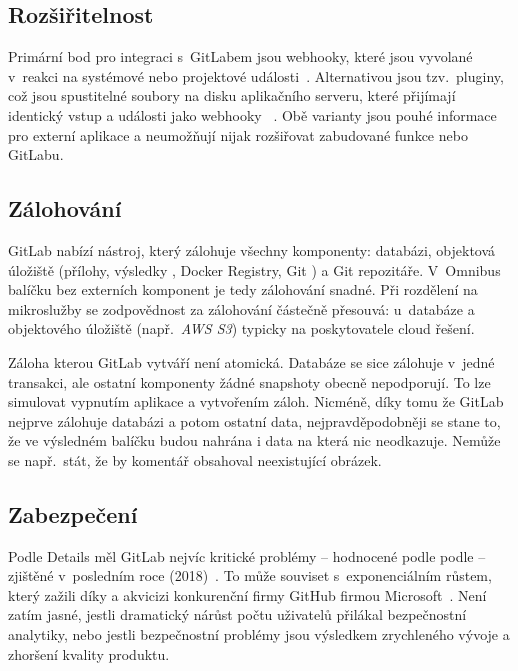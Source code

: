     \subsection{Rozšiřitelnost}
        Primární bod pro integraci s~GitLabem jsou webhooky, které jsou vyvolané v~reakci na systémové nebo projektové události~\cite{gitlab-webhooks}. Alternativou jsou tzv.~pluginy, což jsou spustitelné soubory na disku aplikačního serveru, které přijímají identický vstup a události jako webhooky ~\cite{gitlab-plugins}. Obě varianty jsou pouhé informace pro externí aplikace a neumožňují nijak rozšiřovat zabudované funkce nebo  GitLabu.

    \subsection{Zálohování}
        GitLab nabízí nástroj, který zálohuje všechny komponenty: databázi, objektová úložiště (přílohy, výsledky \CICD, Docker Registry, Git ) a Git repozitáře. V~Omnibus balíčku bez externích komponent je tedy zálohování snadné. Při rozdělení na mikroslužby se zodpovědnost za zálohování částečně přesouvá: u~databáze a objektového úložiště (např.~\textit{AWS S3}) typicky na poskytovatele cloud řešení.

        Záloha kterou GitLab vytváří není atomická. Databáze se sice zálohuje v~jedné transakci, ale ostatní komponenty žádné snapshoty obecně nepodporují. To lze simulovat vypnutím aplikace a vytvořením záloh. Nicméně, díky tomu že GitLab nejprve zálohuje databázi a potom ostatní data, nejpravděpodobněji se stane to, že ve výsledném balíčku budou nahrána i data na která nic neodkazuje. Nemůže se např.~stát, že by komentář obsahoval neexistující obrázek.

    \subsection{Zabezpečení}
        Podle  Details měl GitLab nejvíc kritické problémy -- hodnocené podle podle  -- zjištěné v~posledním roce (2018)~\cite{cve-gitlab}. To může souviset s~exponenciálním růstem, který zažili díky  a akvicizi konkurenční firmy GitHub firmou Microsoft~\cite{gitlab-growth}. Není zatím jasné, jestli dramatický nárůst počtu uživatelů přilákal bezpečnostní analytiky, nebo jestli bezpečnostní problémy jsou výsledkem zrychleného vývoje a zhoršení kvality produktu.



